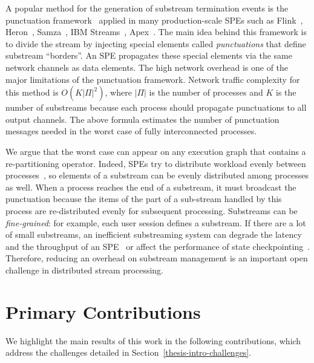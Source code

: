 A popular method for the generation of substream termination events is the punctuation framework~\cite{tucker2003exploiting} applied in many production-scale SPEs such as Flink~\cite{carbone2015apache}, Heron~\cite{Kulkarni:2015:THS:2723372.2742788}, Samza~\cite{Noghabi:2017:SSS:3137765.3137770}, IBM Streams~\cite{jacques2016consistent}, Apex~\cite{pathak2016introduction}. The main idea behind this framework is to divide the stream by injecting special elements called {\em punctuations} that define substream ``borders''. An SPE propagates these special elements via the same network channels as data elements. The high network overhead is one of the major limitations of the punctuation framework. Network traffic complexity for this method is $O(K|\Pi|^2)$, where $|\Pi|$ is the number of processes and $K$ is the number of substreams because each process should propagate punctuations to all output channels. The above formula estimates the number of punctuation messages needed in the worst case of fully interconnected processes. 

We argue that the worst case can appear on any execution graph that contains a re-partitioning operator. Indeed, SPEs try to distribute workload evenly between processes~\cite{carbone2015apache, Kulkarni:2015:THS:2723372.2742788, Akidau:2013:MFS:2536222.2536229}, so elements of a substream can be evenly distributed among processes as well. When a process reaches the end of a substream, it must broadcast the punctuation because the items of the part of a sub-stream handled by this process are re-distributed evenly for subsequent processing. Substreams can be {\em fine-grained}: for example, each user session defines a substream. If there are a lot of small substreams, an inefficient substreaming system can degrade the latency~\cite{DBLP:journals/pvldb/BegoliACHKKMS21} and the throughput of an SPE~\cite{Li:2008:OPN:1453856.1453890} or affect the performance of state checkpointing~\cite{zhang2021research}. Therefore, reducing an overhead on substream management is an important open challenge in distributed stream processing.

\section{Primary Contributions}
\label{thesis-intro-contributions}

We highlight the main results of this work in the following contributions, which address the challenges detailed in Section~\ref{thesis-intro-challenges}.

